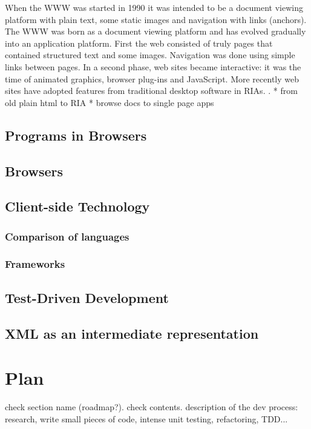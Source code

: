     When the WWW was started in 1990 it was intended to be a document viewing
platform with plain text, some static images and navigation with links (anchors).
    The WWW was born as a document viewing platform and has evolved gradually
into an application platform. First the web consisted of truly pages that contained
structured text and some images. Navigation was done using simple links between
pages. In a second phase, web sites became interactive: it was the time of animated
graphics, browser plug-ins and JavaScript. More recently web sites have adopted
features from traditional desktop software in RIAs. .
    * from old plain html to RIA 
    * browse docs to single page apps

\section{Programs in Browsers}    

\section{Browsers}
\section{Client-side Technology}

\subsection{Comparison of languages}
\subsection{Frameworks}

\section{Test-Driven Development}
\section{XML as an intermediate representation}


\chapter{Plan}
check section name (roadmap?). check contents.
description of the dev process: research, write small pieces of code, intense unit testing, refactoring, TDD...

